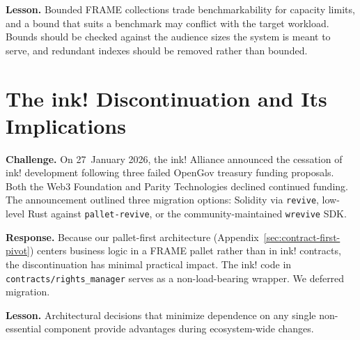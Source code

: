 \textbf{Lesson.} Bounded FRAME collections trade benchmarkability for capacity limits, and a bound that suits a benchmark may conflict with the target workload. Bounds should be checked against the audience sizes the system is meant to serve, and redundant indexes should be removed rather than bounded.

\section[ink! Discontinuation]{The ink! Discontinuation and Its Implications}\label{sec:ink-discontinuation}

\textbf{Challenge.} On 27~January 2026, the ink! Alliance announced the cessation of ink! development following three failed OpenGov treasury funding proposals. Both the Web3 Foundation and Parity Technologies declined continued funding. The announcement outlined three migration options: Solidity via \texttt{revive}, low-level Rust against \texttt{pallet-revive}, or the community-maintained \texttt{wrevive} SDK.

\textbf{Response.} Because our pallet-first architecture (Appendix~\ref{sec:contract-first-pivot}) centers business logic in a FRAME pallet rather than in ink! contracts, the discontinuation has minimal practical impact. The ink! code in \texttt{contracts/rights\_manager} serves as a non-load-bearing wrapper. We deferred migration.

\textbf{Lesson.} Architectural decisions that minimize dependence on any single non-essential component provide advantages during ecosystem-wide changes.

